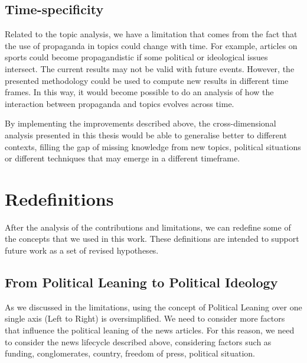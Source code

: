 \subsection{Time-specificity}
Related to the topic analysis, we have a limitation that comes from the fact that the use of propaganda in topics could change with time. %
For example, articles on sports could become propagandistic if some political or ideological issues intersect. %
The current results may not be valid with future events.
However, the presented methodology could be used to compute new results in different time frames.
In this way, it would become possible to do an analysis of how the interaction between propaganda and topics evolves across time.


By implementing the improvements described above, the cross-dimensional analysis presented in this thesis would be able to generalise better to different contexts, filling the gap of missing knowledge from new topics, political situations or different techniques that may emerge in a different timeframe.



\section{Redefinitions}


After the analysis of the contributions and limitations, we can redefine some of the concepts that we used in this work. These definitions are intended to support future work as a set of revised hypotheses.


\subsection{From Political Leaning to Political Ideology}

As we discussed in the limitations, using the concept of Political Leaning over one single axis (Left to Right) is oversimplified.
We need to consider more factors that influence the political leaning of the news articles.
For this reason, we need to consider the news lifecycle described above, considering factors such as funding, conglomerates, country, freedom of press, political situation.

